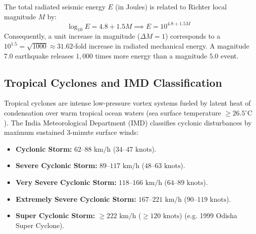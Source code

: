 \begin{keyequation}
The total radiated seismic energy $E$ (in Joules) is related to Richter local magnitude $M$ by:
\begin{equation}
\log_{10} E = 4.8 + 1.5 M \implies E = 10^{4.8 + 1.5 M}
\end{equation}
Consequently, a unit increase in magnitude ($\Delta M = 1$) corresponds to a $10^{1.5} = \sqrt{1000} \approx 31.62$-fold increase in radiated mechanical energy. A magnitude $7.0$ earthquake releases $1{,}000$ times more energy than a magnitude $5.0$ event.
\end{keyequation}

\subsection{Tropical Cyclones and IMD Classification}
Tropical cyclones are intense low-pressure vortex systems fueled by latent heat of condensation over warm tropical ocean waters (sea surface temperature $\ge 26.5^\circ\text{C}$). The India Meteorological Department (IMD) classifies cyclonic disturbances by maximum sustained 3-minute surface winds:
\begin{itemize}[leftmargin=1.5em]
    \item \textbf{Cyclonic Storm:} $62\text{--}88\text{ km/h}$ ($34\text{--}47\text{ knots}$).
    \item \textbf{Severe Cyclonic Storm:} $89\text{--}117\text{ km/h}$ ($48\text{--}63\text{ knots}$).
    \item \textbf{Very Severe Cyclonic Storm:} $118\text{--}166\text{ km/h}$ ($64\text{--}89\text{ knots}$).
    \item \textbf{Extremely Severe Cyclonic Storm:} $167\text{--}221\text{ km/h}$ ($90\text{--}119\text{ knots}$).
    \item \textbf{Super Cyclonic Storm:} $\ge 222\text{ km/h}$ ($\ge 120\text{ knots}$) (e.g. 1999 Odisha Super Cyclone).
\end{itemize}

